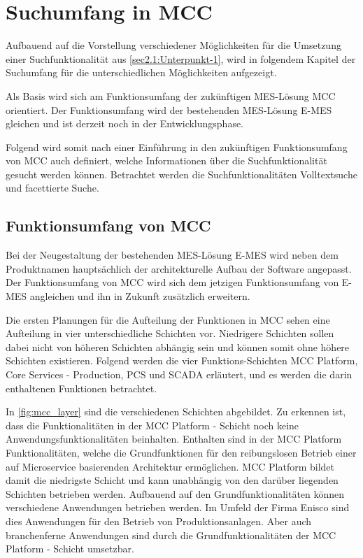 \chapter{Suchumfang in MCC\label{chap3:Drittes-Kapitel}}

Aufbauend auf die Vorstellung verschiedener Möglichkeiten für die Umsetzung einer Suchfunktionalität aus \autoref{sec2.1:Unterpunkt-1}, wird in folgendem Kapitel der Suchumfang für die unterschiedlichen Möglichkeiten aufgezeigt.

Als Basis wird sich am Funktionsumfang der zukünftigen MES-Lösung \glqq MCC\grqq{} orientiert. Der Funktionsumfang wird der bestehenden MES-Lösung \glqq E-MES\grqq{} gleichen und ist derzeit noch in der Entwicklungsphase.

Folgend wird somit nach einer Einführung in den zukünftigen Funktionsumfang von \glqq MCC\grqq{} auch definiert, welche Informationen über die Suchfunktionalität gesucht werden können. Betrachtet werden die Suchfunktionalitäten \glqq Volltextsuche\grqq{} und \glqq facettierte Suche\grqq{}.

\section{Funktionsumfang von MCC\label{sec3.1:Unterunterpunkt-1}}

Bei der Neugestaltung der bestehenden MES-Lösung \glqq E-MES\grqq{} wird neben dem Produktnamen hauptsächlich der architekturelle Aufbau der Software angepasst. Der Funktionsumfang von \glqq MCC\grqq{} wird sich dem jetzigen Funktionsumfang von \glqq E-MES\grqq{} angleichen und ihn in Zukunft zusätzlich erweitern.

Die ersten Planungen für die Aufteilung der Funktionen in \glqq MCC\grqq{} sehen eine Aufteilung in vier unterschiedliche Schichten vor. Niedrigere Schichten sollen dabei nicht von höheren Schichten abhängig sein und können somit ohne höhere Schichten existieren. Folgend werden die vier Funktions-Schichten \glqq MCC Platform\grqq{}, \glqq Core Services - Production\grqq{}, \glqq PCS\grqq{} und \glqq SCADA\grqq{} erläutert, und es werden die darin enthaltenen Funktionen betrachtet.

In \autoref{fig:mcc_layer} sind die verschiedenen Schichten abgebildet. Zu erkennen ist, dass die Funktionalitäten in der \glqq MCC Platform\grqq{} - Schicht noch keine Anwendungsfunktionalitäten beinhalten. Enthalten sind in der \glqq MCC Platform\grqq{} Funktionalitäten, welche die Grundfunktionen für den reibungslosen Betrieb einer auf Microservice basierenden Architektur ermöglichen. \glqq MCC Platform\grqq{} bildet damit die niedrigste Schicht und kann unabhängig von den darüber liegenden Schichten betrieben werden. Aufbauend auf den Grundfunktionalitäten können verschiedene Anwendungen betrieben werden. Im Umfeld der Firma Enisco sind dies Anwendungen für den Betrieb von Produktionsanlagen. Aber auch branchenferne Anwendungen sind durch die Grundfunktionalitäten der \glqq MCC Platform\grqq{} - Schicht umsetzbar.

